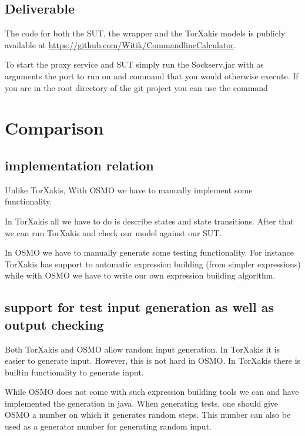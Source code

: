 \documentclass[11pt,a4paper]{article}
\begin{document}
\subsection{Deliverable}

The code for both the SUT, the wrapper and the TorXakis models is
publicly available at
\url{https://github.com/Witik/CommandlineCalculator}.

To start the proxy service and SUT simply run the Sockserv.jar with as
arguments the port to run on and command that you would otherwise
execute. If you are in the root directory of the git project you can
use the command

\section{Comparison}
\subsection{implementation relation}
Unlike TorXakis, With OSMO we have to manually implement some functionality.

In TorXakis all we have to do is describe states and state
transitions. After that we can run TorXakis and check our model
against our SUT.

In OSMO we have to manually generate some testing functionality. For
instance TorXakis has support to automatic expression building (from
simpler expressions) while with OSMO we have to write our own
expression building algorithm.

\subsection{support for test input generation as well as output checking}

Both TorXakis and OSMO allow random input generation. In TorXakis it
is easier to generate input. However, this is not hard in OSMO. In
TorXakis there is builtin functionality to generate input.

While OSMO does not come with such expression building tools we can
and have implemented the generation in java. When generating tests,
one should give OSMO a number on which it generates random steps. This
number can also be used as a generator number for generating random
input.
\end{document}

